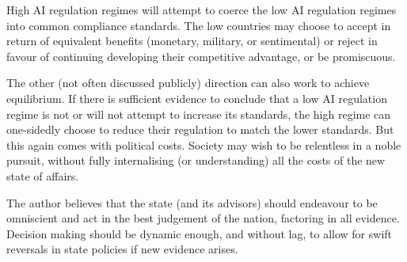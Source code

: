 \documentclass[11pt]{article}
\begin{document}
\textsc{}High\textsc{} AI regulation regimes will attempt to coerce the \textsc{}low\textsc{} AI regulation regimes into common compliance standards. The \textsc{}low\textsc{} countries may choose to accept in return of equivalent benefits (monetary, military, or sentimental) or reject in favour of continuing developing their competitive advantage, or be promiscuous.

The other (not often discussed publicly) direction can also work to achieve equilibrium. If there is sufficient evidence to conclude that a \textsc{}low\textsc{} AI regulation regime is not or will not attempt to increase its standards, the high regime can one-sidedly choose to reduce their regulation to match the lower standards. But this again comes with political costs. Society may wish to be relentless in a noble pursuit, without fully internalising (or understanding) all the costs of the new state of affairs.

The author believes that the state (and its advisors) should endeavour to be omniscient and act in the best judgement of the nation, factoring in all evidence. Decision making should be dynamic enough, and without lag, to allow for swift reversals in state policies if new evidence arises.

%
% 
%

   












%	
\end{document}
